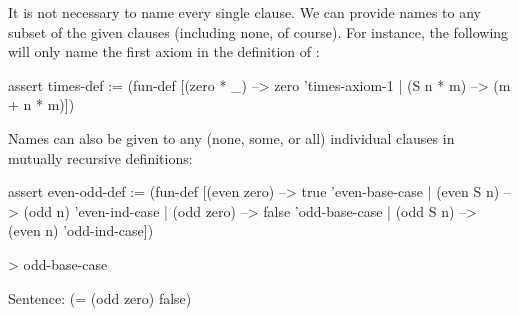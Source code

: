 It is not necessary to name every single clause. We can provide
names to any subset of the given clauses (including none, of course). 
For instance, the following will only name the first axiom
in the definition of :
\begin{tcAthena}
assert times-def :=
      (fun-def [(zero * _) --> zero        'times-axiom-1
              | (S n * m) --> (m + n * m)])
\end{tcAthena}
Names can also be given to any (none, some, or all) individual clauses 
in mutually recursive definitions: 
\begin{tcAthena}
assert even-odd-def :=  
  (fun-def [(even zero) --> true     'even-base-case
          | (even S n) --> (odd n)   'even-ind-case
          | (odd zero) --> false     'odd-base-case 
          | (odd S n) --> (even n)   'odd-ind-case])

> odd-base-case 

Sentence: (= (odd zero)
             false)
\end{tcAthena}

